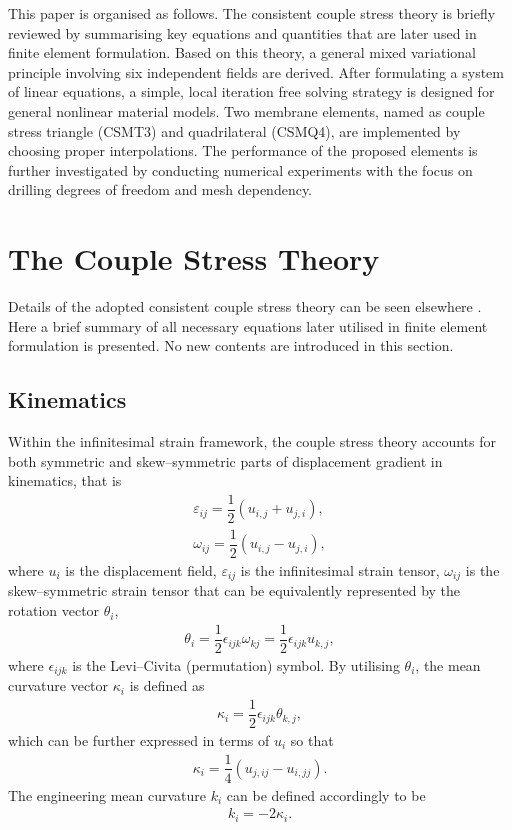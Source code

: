 \documentclass[3p,sort&compress,11pt,fleqn]{elsarticle}
\begin{document}
This paper is organised as follows. The consistent couple stress theory is briefly reviewed by summarising key equations and quantities that are later used in finite element formulation. Based on this theory, a general mixed variational principle involving six independent fields are derived. After formulating a system of linear equations, a simple, local iteration free solving strategy is designed for general nonlinear material models. Two membrane elements, named as couple stress triangle (CSMT3) and quadrilateral (CSMQ4), are implemented by choosing proper interpolations. The performance of the proposed elements is further investigated by conducting numerical experiments with the focus on drilling degrees of freedom and mesh dependency.
\section{The Couple Stress Theory}
Details of the adopted consistent couple stress theory can be seen elsewhere \citep{Hadjesfandiari2011}. Here a brief summary of all necessary equations later utilised in finite element formulation is presented. No new contents are introduced in this section.
\subsection{Kinematics}
Within the infinitesimal strain framework, the couple stress theory \citep{Hadjesfandiari2011} accounts for both symmetric and skew--symmetric parts of displacement gradient in kinematics, that is
\begin{gather}\label{eq:varepsilon}
\varepsilon_{ij}=\dfrac{1}{2}\left(u_{i,j}+u_{j,i}\right),\\
\omega_{ij}=\dfrac{1}{2}\left(u_{i,j}-u_{j,i}\right),
\end{gather}
where $u_i$ is the displacement field, $\varepsilon_{ij}$ is the infinitesimal strain tensor, $\omega_{ij}$ is the skew--symmetric strain tensor that can be equivalently represented by the rotation vector $\theta_i$,
\begin{gather}\label{eq:theta}
\theta_i=\dfrac{1}{2}\epsilon_{ijk}\omega_{kj}=\dfrac{1}{2}\epsilon_{ijk}u_{k,j},
\end{gather}
where $\epsilon_{ijk}$ is the Levi--Civita (permutation) symbol. By utilising $\theta_i$, the mean curvature vector $\kappa_i$ is defined as
\begin{gather}\label{eq:kappa}
\kappa_i=\dfrac{1}{2}\epsilon_{ijk}\theta_{k,j},
\end{gather}
which can be further expressed in terms of $u_i$ so that
\begin{gather}
\kappa_i=\dfrac{1}{4}\left(u_{j,ij}-u_{i,jj}\right).
\end{gather}
The engineering mean curvature $k_i$ can be defined accordingly to be
\begin{gather}
k_i=-2\kappa_i.
\end{gather}
\end{document}
